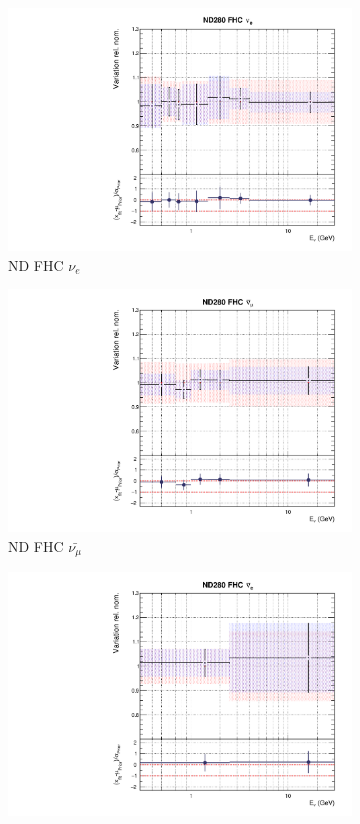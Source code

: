 \begin{figure}[t]
\begin{subfigure}{0.24\textwidth}
  \includegraphics[width=0.95\linewidth]{figs/rhcmpdat248flux_1}
  \caption{ND FHC $\nu_e$}
  \label{fig:}
\end{subfigure}
\begin{subfigure}{0.24\textwidth}
  \centering
  \includegraphics[width=0.95\linewidth]{figs/rhcmpdat248flux_2}
  \caption{ND FHC $\bar{\nu_{\mu}}$}
  \label{fig:}
\end{subfigure}
\begin{subfigure}{0.24\textwidth}
  \centering
  \includegraphics[width=0.95\linewidth]{figs/rhcmpdat248flux_3}

\end{subfigure}
\end{figure}
